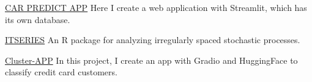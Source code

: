 {}
{\href{https://github.com/Wilmar3752/car_predict}{CAR PREDICT APP}}
{Here I create a web application with Streamlit, which has its own database.}
{}

{}
{\href{https://github.com/Wilmar3752/itseries}{ITSERIES}}
{An R package for analyzing irregularly spaced stochastic processes.}
{}

{}
{\href{https://github.com/Wilmar3752/cluster-app}{Cluster-APP}}
{In this project, I create an app with Gradio and HuggingFace to classify credit card customers.}
{}








